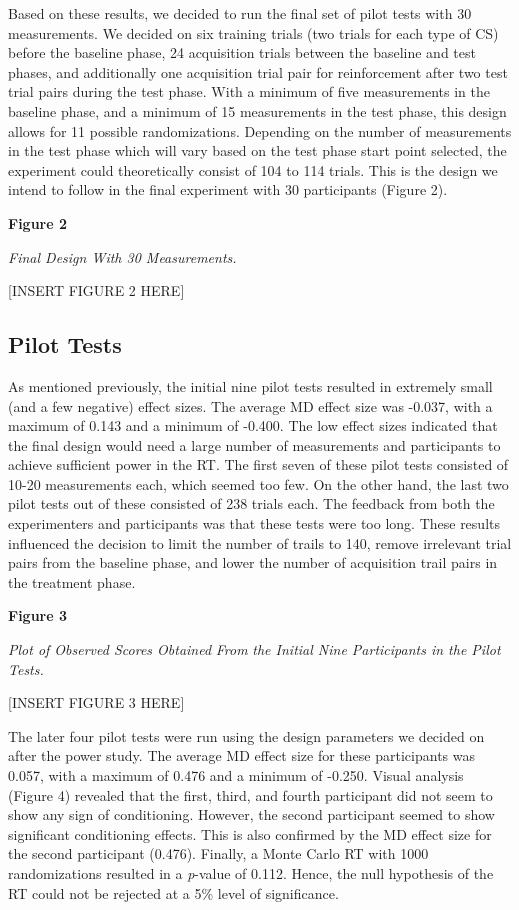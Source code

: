\documentclass{article}
\begin{document}
Based on these results, we decided to run the final set of pilot tests with 30 measurements. We decided on six training trials (two trials for each type of CS) before the baseline phase, 24 acquisition trials between the baseline and test phases, and additionally one acquisition trial pair for reinforcement after two test trial pairs during the test phase. With a minimum of five measurements in the baseline phase, and a minimum of 15 measurements in the test phase, this design allows for 11 possible randomizations. Depending on the number of measurements in the test phase which will vary based on the test phase start point selected, the experiment could theoretically consist of 104 to 114 trials. This is the design we intend to follow in the final experiment with 30 participants (Figure 2).

\textbf{Figure 2}

\emph{Final Design With 30 Measurements.}

[INSERT FIGURE 2 HERE]

\subsection{Pilot Tests}

As mentioned previously, the initial nine pilot tests resulted in extremely small (and a few negative) effect sizes. The average MD effect size was -0.037, with a maximum of 0.143 and a minimum of -0.400. The low effect sizes indicated that the final design would need a large number of measurements and participants to achieve sufficient power in the RT. The first seven of these pilot tests consisted of 10-20 measurements each, which seemed too few. On the other hand, the last two pilot tests out of these consisted of 238 trials each. The feedback from both the experimenters and participants was that these tests were too long. These results influenced the decision to limit the number of trails to 140, remove irrelevant trial pairs from the baseline phase, and lower the number of acquisition trail pairs in the treatment phase. 

\textbf{Figure 3}

\emph{Plot of Observed Scores Obtained }\emph{From}\emph{ the Initial Nine Participants in the Pilot Tests.}

[INSERT FIGURE 3 HERE]

The later four pilot tests were run using the design parameters we decided on after the power study. The average MD effect size for these participants was 0.057, with a maximum of 0.476 and a minimum of -0.250. Visual analysis (Figure 4) revealed that the first, third, and fourth participant did not seem to show any sign of conditioning. However, the second participant seemed to show significant conditioning effects. This is also confirmed by the MD effect size for the second participant (0.476). Finally, a Monte Carlo RT with 1000 randomizations resulted in a \emph{p}-value of 0.112. Hence, the null hypothesis of the RT could not be rejected at a 5\% level of significance. 
\end{document}
